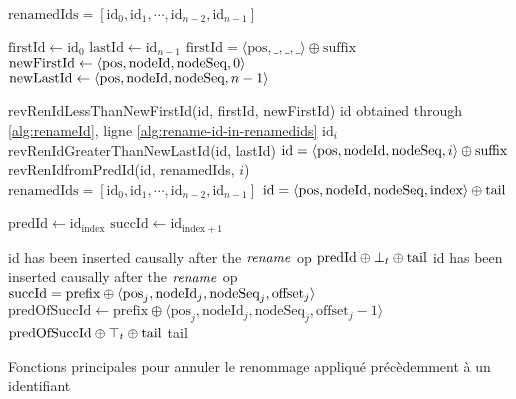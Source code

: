 \begin{algorithm}[!ht]
  \footnotesize
  \begin{algorithmic}[1]
      \Statex \Comment $\text{renamedIds} = [\text{id}_0, \text{id}_1, \cdots, \text{id}_{n-2}, \text{id}_{n-1}]$

        \State $\text{firstId} \gets \text{id}_0$
        \State $\text{lastId} \gets \text{id}_{n - 1}$
        \Statex \Comment $\text{firstId} = \langle \text{pos}, \_, \_, \_ \rangle \oplus \text{suffix}$
        \State $\text{newFirstId} \gets \langle \text{pos},\text{nodeId},\text{nodeSeq},0 \rangle$
        \State $\text{newLastId} \gets \langle \text{pos},\text{nodeId},\text{nodeSeq},n-1 \rangle$

          \State \Return revRenIdLessThanNewFirstId(id, firstId, newFirstId)
            \Statex \Comment id obtained through \autoref{alg:renameId}, ligne \ref{alg:rename-id-in-renamedids}
            \State \Return $\text{id}_i$ \label{alg:revertRenameId-case-i}
            \State \Return revRenIdGreaterThanNewLastId(id, lastId)
        \Else
            \Statex \Comment $\text{id} = \langle \text{pos},\text{nodeId},\text{nodeSeq},{i} \rangle \oplus \text{suffix}$
            \State \Return revRenIdfromPredId(id, renamedIds, $i$)
        \EndIf
    \EndFunction
    \\
        \Statex \Comment $\text{renamedIds} = [\text{id}_0, \text{id}_1, \cdots, \text{id}_{n-2}, \text{id}_{n-1}]$
        \Statex \Comment $\text{id} = \langle \text{pos},\text{nodeId},\text{nodeSeq},{\text{index}} \rangle \oplus \text{tail}$

        \State $\text{predId} \gets \text{id}_{\text{index}}$
        \State $\text{succId} \gets \text{id}_{\text{index}+1}$

            \Statex \Comment id has been inserted causally after the $\mathit{rename}$ op
            \State \Return $\text{predId} \oplus \bot_t \oplus \text{tail}$ \Comment \commentbott \label{alg:revertRenameId-case-iii}
            \Statex \Comment id has been inserted causally after the $\mathit{rename}$ op
            \Statex \Comment $\text{succId} = \text{prefix} \oplus \langle \text{pos}_{j},\text{nodeId}_{j},\text{nodeSeq}_{j},\text{offset}_{j} \rangle$
            \State $\text{predOfSuccId} \gets \text{prefix} \oplus \langle \text{pos}_j,\text{nodeId}_j,\text{nodeSeq}_j,\text{offset}_{j} - 1 \rangle$
            \State \Return $\text{predOfSuccId} \oplus \top_t \oplus \text{tail}$ \Comment \commenttopt
        \Else
            \State \Return tail \label{alg:revertRenameId-case-ii}
        \EndIf
    \EndFunction
  \end{algorithmic}
  \caption{Fonctions principales pour annuler le renommage appliqué précèdemment à un identifiant}
  \label{alg:revertRenameId}
\end{algorithm}

